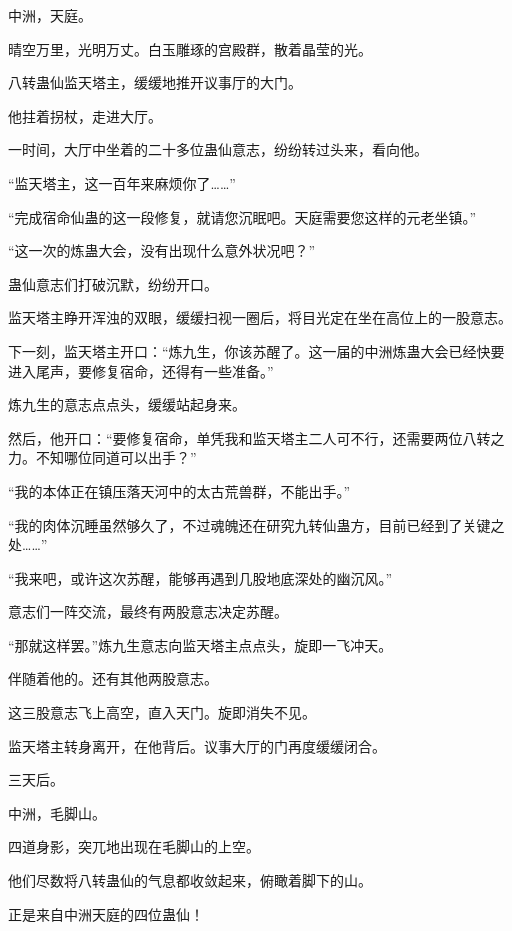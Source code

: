 
\begin{this_body}



中洲，天庭。

晴空万里，光明万丈。白玉雕琢的宫殿群，散着晶莹的光。

八转蛊仙监天塔主，缓缓地推开议事厅的大门。

他拄着拐杖，走进大厅。

一时间，大厅中坐着的二十多位蛊仙意志，纷纷转过头来，看向他。

“监天塔主，这一百年来麻烦你了……”

“完成宿命仙蛊的这一段修复，就请您沉眠吧。天庭需要您这样的元老坐镇。”

“这一次的炼蛊大会，没有出现什么意外状况吧？”

蛊仙意志们打破沉默，纷纷开口。

监天塔主睁开浑浊的双眼，缓缓扫视一圈后，将目光定在坐在高位上的一股意志。

下一刻，监天塔主开口：“炼九生，你该苏醒了。这一届的中洲炼蛊大会已经快要进入尾声，要修复宿命，还得有一些准备。”

炼九生的意志点点头，缓缓站起身来。

然后，他开口：“要修复宿命，单凭我和监天塔主二人可不行，还需要两位八转之力。不知哪位同道可以出手？”

“我的本体正在镇压落天河中的太古荒兽群，不能出手。”

“我的肉体沉睡虽然够久了，不过魂魄还在研究九转仙蛊方，目前已经到了关键之处……”

“我来吧，或许这次苏醒，能够再遇到几股地底深处的幽沉风。”

意志们一阵交流，最终有两股意志决定苏醒。

“那就这样罢。”炼九生意志向监天塔主点点头，旋即一飞冲天。

伴随着他的。还有其他两股意志。

这三股意志飞上高空，直入天门。旋即消失不见。

监天塔主转身离开，在他背后。议事大厅的门再度缓缓闭合。

三天后。

中洲，毛脚山。

四道身影，突兀地出现在毛脚山的上空。

他们尽数将八转蛊仙的气息都收敛起来，俯瞰着脚下的山。

正是来自中洲天庭的四位蛊仙！


\end{this_body}
